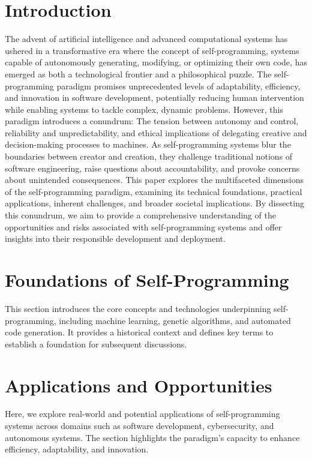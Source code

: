 \documentclass[]{article}
\begin{document}
\section{Introduction}
The advent of artificial intelligence and advanced computational systems has ushered in a transformative era where the concept of self-programming, systems capable of autonomously generating, modifying, or optimizing their own code, has emerged as both a technological frontier and a philosophical puzzle. The self-programming paradigm promises unprecedented levels of adaptability, efficiency, and innovation in software development, potentially reducing human intervention while enabling systems to tackle complex, dynamic problems. However, this paradigm introduces a conundrum: The tension between autonomy and control, reliability and unpredictability, and ethical implications of delegating creative and decision-making processes to machines. As self-programming systems blur the boundaries between creator and creation, they challenge traditional notions of software engineering, raise questions about accountability, and provoke concerns about unintended consequences. This paper explores the multifaceted dimensions of the self-programming paradigm, examining its technical foundations, practical applications, inherent challenges, and broader societal implications. By dissecting this conundrum, we aim to provide a comprehensive understanding of the opportunities and risks associated with self-programming systems and offer insights into their responsible development and deployment.

\section{Foundations of Self-Programming}
This section introduces the core concepts and technologies underpinning self-programming, including machine learning, genetic algorithms, and automated code generation. It provides a historical context and defines key terms to establish a foundation for subsequent discussions.

\section{Applications and Opportunities}
Here, we explore real-world and potential applications of self-programming systems across domains such as software development, cybersecurity, and autonomous systems. The section highlights the paradigm’s capacity to enhance efficiency, adaptability, and innovation.
\end{document}
